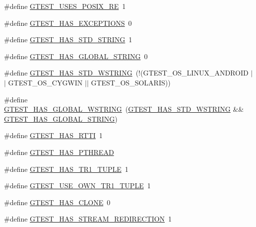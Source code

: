 \begin{DoxyCompactItemize}
\item 
\#define \hyperlink{gtest-port_8h_acecef794eeb09598cd47da764271cb18}{G\-T\-E\-S\-T\-\_\-\-U\-S\-E\-S\-\_\-\-P\-O\-S\-I\-X\-\_\-\-R\-E}~1
\item 
\#define \hyperlink{gtest-port_8h_aedcf220690e6589d0fc2bd3db768ea66}{G\-T\-E\-S\-T\-\_\-\-H\-A\-S\-\_\-\-E\-X\-C\-E\-P\-T\-I\-O\-N\-S}~0
\item 
\#define \hyperlink{gtest-port_8h_adba1121430c11cee8ba0c74e8cf6aa40}{G\-T\-E\-S\-T\-\_\-\-H\-A\-S\-\_\-\-S\-T\-D\-\_\-\-S\-T\-R\-I\-N\-G}~1
\item 
\#define \hyperlink{gtest-port_8h_a6ab57c4a17233dd4ed30c2926bb99cc5}{G\-T\-E\-S\-T\-\_\-\-H\-A\-S\-\_\-\-G\-L\-O\-B\-A\-L\-\_\-\-S\-T\-R\-I\-N\-G}~0
\item 
\#define \hyperlink{gtest-port_8h_a6e087748d8bbd2ca57c487b6ad268670}{G\-T\-E\-S\-T\-\_\-\-H\-A\-S\-\_\-\-S\-T\-D\-\_\-\-W\-S\-T\-R\-I\-N\-G}~(!(G\-T\-E\-S\-T\-\_\-\-O\-S\-\_\-\-L\-I\-N\-U\-X\-\_\-\-A\-N\-D\-R\-O\-I\-D $\vert$$\vert$ G\-T\-E\-S\-T\-\_\-\-O\-S\-\_\-\-C\-Y\-G\-W\-I\-N $\vert$$\vert$ G\-T\-E\-S\-T\-\_\-\-O\-S\-\_\-\-S\-O\-L\-A\-R\-I\-S))
\item 
\#define \hyperlink{gtest-port_8h_afca9ecaf5846561187a15b75013aa85b}{G\-T\-E\-S\-T\-\_\-\-H\-A\-S\-\_\-\-G\-L\-O\-B\-A\-L\-\_\-\-W\-S\-T\-R\-I\-N\-G}~(\hyperlink{gtest-port_8h_a6e087748d8bbd2ca57c487b6ad268670}{G\-T\-E\-S\-T\-\_\-\-H\-A\-S\-\_\-\-S\-T\-D\-\_\-\-W\-S\-T\-R\-I\-N\-G} \&\& \hyperlink{gtest-port_8h_a6ab57c4a17233dd4ed30c2926bb99cc5}{G\-T\-E\-S\-T\-\_\-\-H\-A\-S\-\_\-\-G\-L\-O\-B\-A\-L\-\_\-\-S\-T\-R\-I\-N\-G})
\item 
\#define \hyperlink{gtest-port_8h_a9ba781217167f905bff2f1c410a97930}{G\-T\-E\-S\-T\-\_\-\-H\-A\-S\-\_\-\-R\-T\-T\-I}~1
\item 
\#define \hyperlink{gtest-port_8h_a3341397e1952de0b9cd88762d4d3ae4b}{G\-T\-E\-S\-T\-\_\-\-H\-A\-S\-\_\-\-P\-T\-H\-R\-E\-A\-D}
\item 
\#define \hyperlink{gtest-port_8h_a6de49dd4cbae1db15dc6edca3b179d1b}{G\-T\-E\-S\-T\-\_\-\-H\-A\-S\-\_\-\-T\-R1\-\_\-\-T\-U\-P\-L\-E}~1
\item 
\#define \hyperlink{gtest-port_8h_afa144e5f5d039db0df873e7ad48c1fda}{G\-T\-E\-S\-T\-\_\-\-U\-S\-E\-\_\-\-O\-W\-N\-\_\-\-T\-R1\-\_\-\-T\-U\-P\-L\-E}~1
\item 
\#define \hyperlink{gtest-port_8h_a40c075a7f969a694e59532356be59fd5}{G\-T\-E\-S\-T\-\_\-\-H\-A\-S\-\_\-\-C\-L\-O\-N\-E}~0
\item 
\#define \hyperlink{gtest-port_8h_add695166eb7b691f93777525d5881062}{G\-T\-E\-S\-T\-\_\-\-H\-A\-S\-\_\-\-S\-T\-R\-E\-A\-M\-\_\-\-R\-E\-D\-I\-R\-E\-C\-T\-I\-O\-N}~1

\end{DoxyCompactItemize}
